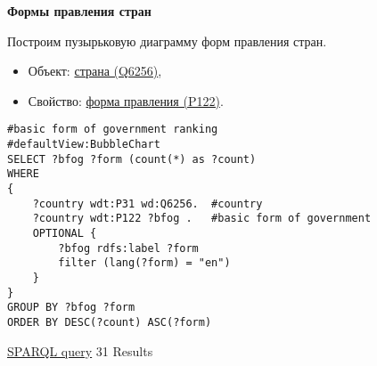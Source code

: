 \textbf{Формы правления стран}

Построим пузырьковую диаграмму форм правления стран.

\begin{itemize}
    \item Объект: \href{https://www.wikidata.org/wiki/Q6256}{страна (Q6256)},
    \item Свойство: \href{https://www.wikidata.org/wiki/Property:P122}{форма правления (P122)}.
\end{itemize}

\begin{lstlisting}[language=SPARQL]
#basic form of government ranking
#defaultView:BubbleChart
SELECT ?bfog ?form (count(*) as ?count)
WHERE 
{
    ?country wdt:P31 wd:Q6256.  #country
    ?country wdt:P122 ?bfog .   #basic form of government
    OPTIONAL {
		?bfog rdfs:label ?form
		filter (lang(?form) = "en")
	}
}
GROUP BY ?bfog ?form
ORDER BY DESC(?count) ASC(?form)
\end{lstlisting}

\href{https://query.wikidata.org/#%23basic%20form%20of%20government%20ranking%0A%23defaultView%3ABubbleChart%0ASELECT%20%3Fbfog%20%3Fform%20%28count%28%2a%29%20as%20%3Fcount%29%0AWHERE%20%0A%7B%0A%20%20%20%20%3Fcountry%20wdt%3AP31%20wd%3AQ6256.%0A%20%20%20%20%3Fcountry%20wdt%3AP122%20%3Fbfog%20.%0A%20%20%20%20OPTIONAL%20%7B%0A%09%09%3Fbfog%20rdfs%3Alabel%20%3Fform%0A%09%09filter%20%28lang%28%3Fform%29%20%3D%20%22en%22%29%0A%09%7D%0A%7D%0AGROUP%20BY%20%3Fbfog%20%3Fform%0AORDER%20BY%20DESC%28%3Fcount%29%20ASC%28%3Fform%29%0A}{SPARQL query} 31 Results




